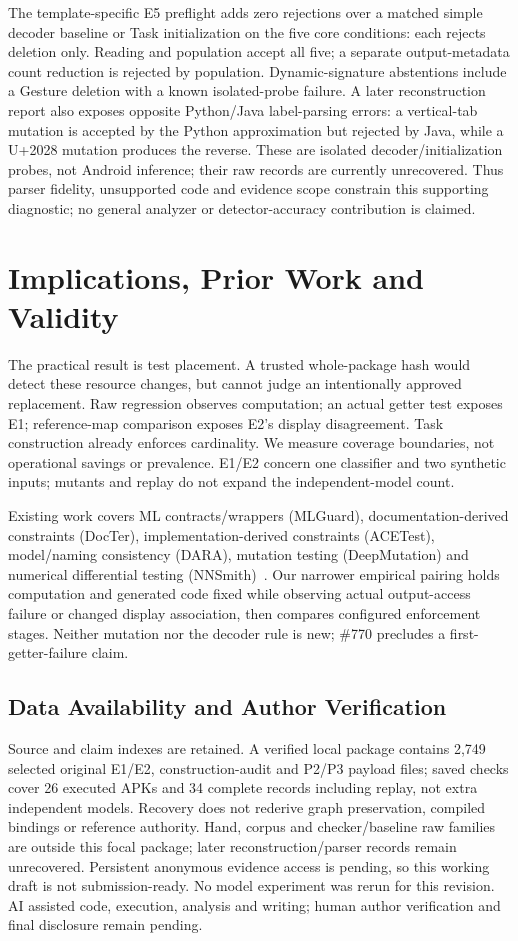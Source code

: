 \documentclass[10pt,conference]{IEEEtran}
\begin{document}
The template-specific E5 preflight adds zero rejections over a matched simple decoder baseline or Task initialization on the five core conditions: each rejects deletion only. Reading and population accept all five; a separate output-metadata count reduction is rejected by population. Dynamic-signature abstentions include a Gesture deletion with a known isolated-probe failure. A later reconstruction report also exposes opposite Python/Java label-parsing errors: a vertical-tab mutation is accepted by the Python approximation but rejected by Java, while a U+2028 mutation produces the reverse. These are isolated decoder/initialization probes, not Android inference; their raw records are currently unrecovered. Thus parser fidelity, unsupported code and evidence scope constrain this supporting diagnostic; no general analyzer or detector-accuracy contribution is claimed.

\section{Implications, Prior Work and Validity}
\label{sec:discussion}
The practical result is test placement. A trusted whole-package hash would detect these resource changes, but cannot judge an intentionally approved replacement. Raw regression observes computation; an actual getter test exposes E1; reference-map comparison exposes E2's display disagreement. Task construction already enforces cardinality. We measure coverage boundaries, not operational savings or prevalence. E1/E2 concern one classifier and two synthetic inputs; mutants and replay do not expand the independent-model count.

\label{sec:related}
Existing work covers ML contracts/wrappers (MLGuard), documentation-derived constraints (DocTer), implementation-derived constraints (ACETest), model/naming consistency (DARA), mutation testing (DeepMutation) and numerical differential testing (NNSmith)~\cite{mlguard,docter,acetest,dara,deepmutation,nnsmith}. Our narrower empirical pairing holds computation and generated code fixed while observing actual output-access failure or changed display association, then compares configured enforcement stages. Neither mutation nor the decoder rule is new; \#770 precludes a first-getter-failure claim.

\label{sec:validity}
\subsection{Data Availability and Author Verification}
Source and claim indexes are retained. A verified local package contains 2,749 selected original E1/E2, construction-audit and P2/P3 payload files; saved checks cover 26 executed APKs and 34 complete records including replay, not extra independent models. Recovery does not rederive graph preservation, compiled bindings or reference authority. Hand, corpus and checker/baseline raw families are outside this focal package; later reconstruction/parser records remain unrecovered. Persistent anonymous evidence access is pending, so this working draft is not submission-ready. No model experiment was rerun for this revision. AI assisted code, execution, analysis and writing; human author verification and final disclosure remain pending.
\end{document}

